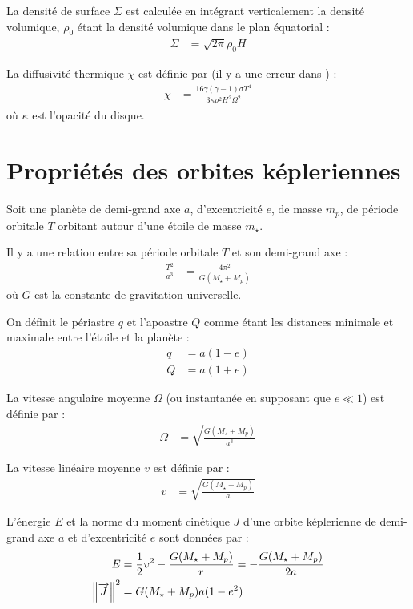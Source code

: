 La densité de surface $\Sigma$ est calculée en intégrant verticalement la densité volumique, $\rho_0$ étant la densité volumique dans le plan équatorial : 
\begin{align}
\Sigma &= \sqrt{2\pi}\rho_0 H
\end{align}

La diffusivité thermique $\chi$ est définie par (il y a une erreur dans \cite[eq. (33)]{paardekooper2011torque}) : 
\begin{align}
\chi &= \frac{16\gamma (\gamma - 1) \sigma T^4}{3\kappa\rho^2H^2\Omega^2}\label{eq:diffusivity}
\end{align}
où $\kappa$ est l'opacité du disque.

\section{Propriétés des orbites képleriennes}
Soit une planète de demi-grand axe $a$, d'excentricité $e$, de masse $m_p$, de période orbitale $T$ orbitant autour d'une étoile de masse $m_\star$. 

Il y a une relation entre sa période orbitale $T$ et son demi-grand axe :
\begin{align}
\frac{T^2}{a^3} &= \frac{4\pi^2}{G(M_\star + M_p)}
\end{align}
où $G$ est la constante de gravitation universelle.

On définit le périastre $q$ et l'apoastre $Q$ comme étant les distances minimale et maximale entre l'étoile et la planète : 
\begin{subequations}
\begin{align}
q &= a (1 - e)\\
Q &= a (1 + e)
\end{align}
\end{subequations}

La vitesse angulaire moyenne $\Omega$ (ou instantanée en supposant que $e\ll 1$) est définie par : 
\begin{align}
\Omega &= \sqrt{\frac{G(M_\star + M_p)}{a^3}}
\end{align}

La vitesse linéaire moyenne $v$ est définie par : 
\begin{align}
v &= \sqrt{\frac{G(M_\star + M_p)}{a}}
\end{align}

L'énergie $E$ et la norme du moment cinétique $J$ d'une orbite képlerienne de demi-grand axe $a$ et d'excentricité $e$ sont
données par :
\begin{align}
E &= \frac{1}{2}v^2 - \frac{G(M_\star + M_p)}{r} = -\frac{G(M_\star + M_p)}{2a}\\
\left\|{\overrightarrow{J}}\right\|^2 &= G(M_\star + M_p) a (1-e^2)
\end{align}

